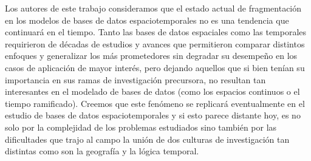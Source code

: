 Los autores de este trabajo consideramos que el estado actual de fragmentación en los modelos de bases de datos espaciotemporales no es una tendencia que continuará en el tiempo. Tanto las bases de datos espaciales como las temporales requirieron de décadas de estudios y avances que permitieron comparar distintos enfoques y generalizar los más prometedores sin degradar su desempeño en los casos de aplicación de mayor interés, pero dejando aquellos que si bien tenían su importancia en sus ramas de investigación precursora, no resultan tan interesantes en el modelado de bases de datos (como los espacios continuos o el tiempo ramificado). Creemos que este fenómeno se replicará eventualmente en el estudio de bases de datos espaciotemporales y si esto parece distante hoy, es no solo por la complejidad de los problemas estudiados sino también por las dificultades que trajo al campo la unión de dos culturas de investigación tan distintas como son la geografía y la lógica temporal.